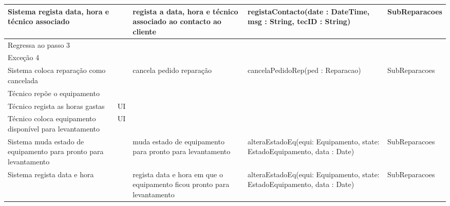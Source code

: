 \documentclass[../relatorio.tex]{subfiles}
\begin{document}
\begin{landscape}
\begin{table}[!h]
\begin{tabular}{|p{5cm}|p{1cm}|p{4cm}|p{6cm}|p{3cm}|}
            \hline
            Sistema regista data, hora e técnico associado
                     & 
                     & regista a data, hora e técnico associado ao contacto ao cliente 
                     & registaContacto(date : DateTime, msg : String, tecID : String)
                     & SubReparacoes
            \\
            \hline
            Regressa ao passo 3
                     & 
                     & 
                     & 
                     & 
            \\
            \hline
            \rowcolor{red!30}
            Exceção 4 &                                                  &                  &     &            \\
            \hline
            Sistema coloca reparação como cancelada
                     & 
                     & cancela pedido reparação
                     & cancelaPedidoRep(ped : Reparacao)
                     & SubReparacoes
            \\
            \hline
            Técnico repõe o equipamento
                     & 
                     & 
                     & 
                     & 
            \\
            \hline
            \rowcolor{yellow}
            Técnico regista as horas gastas
                     & UI
                     & 
                     & 
                     & 
            \\
            \hline
            \rowcolor{yellow}
            Técnico coloca equipamento disponível para levantamento
                     & UI
                     & 
                     & 
                     & 
            \\
            \hline
            Sistema muda estado de equipamento para pronto para levantamento
                     & 
                     & muda estado de equipamento para pronto para levantamento
                     & alteraEstadoEq(equi: Equipamento, state: EstadoEquipamento, data : Date)
                     & SubReparacoes
            \\
            \hline
            Sistema regista data e hora
                     & 
                     & regista data e hora em que o equipamento ficou pronto para levantamento
                     & alteraEstadoEq(equi: Equipamento, state: EstadoEquipamento, data : Date)
                     & SubReparacoes
            \\
            \hline
        \end{tabular}
    \end{table}
\end{landscape}
\end{document}
